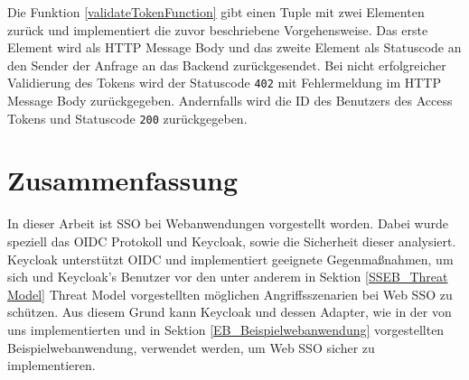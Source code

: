 Die Funktion \ref{validateTokenFunction} gibt einen Tuple mit zwei Elementen zurück und implementiert die zuvor beschriebene Vorgehensweise. Das erste Element wird als HTTP Message Body und das zweite Element als Statuscode an den Sender der Anfrage an das Backend zurückgesendet. Bei nicht erfolgreicher Validierung des Tokens wird der Statuscode \texttt{402} mit Fehlermeldung im HTTP Message Body zurückgegeben. Andernfalls wird die ID des Benutzers des Access Tokens und Statuscode \texttt{200} zurückgegeben.


\section{Zusammenfassung}

In dieser Arbeit ist SSO bei Webanwendungen vorgestellt worden. Dabei wurde speziell das OIDC Protokoll und Keycloak, sowie die Sicherheit dieser analysiert. Keycloak unterstützt OIDC und implementiert geeignete Gegenmaßnahmen, um sich und Keycloak's Benutzer vor den unter anderem in Sektion \ref{SSEB_Threat Model} Threat Model vorgestellten möglichen Angriffsszenarien bei Web SSO zu schützen. Aus diesem Grund kann Keycloak und dessen Adapter, wie in der von uns implementierten und in Sektion \ref{EB_Beispielwebanwendung} vorgestellten Beispielwebanwendung, verwendet werden, um Web SSO sicher zu implementieren.




